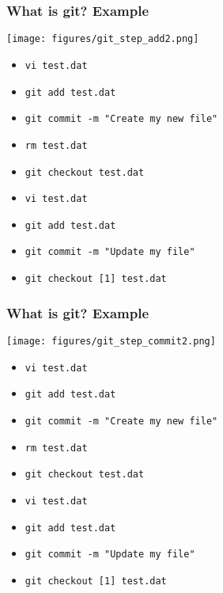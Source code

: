 \documentclass[xcolor=dvipsnames,10pt]{beamer}
\begin{document}
\addtocounter{framenumber}{-1}
\begin{frame}
 \frametitle{What is git? Example}
 
 \begin{center}
  \texttt{[image: figures/git\_step\_add2.png]}
 \end{center}
 \vspace*{-0.5cm}
 
 \begin{itemize}
  \color{gray}
  \item[] \texttt{vi test.dat}
  \item[] \texttt{git add test.dat}
  \item[] \texttt{git commit -m "Create my new file"}
  \item[] \texttt{rm test.dat}
  \item[] \texttt{git checkout test.dat}
  \item[] \texttt{vi test.dat}
  \color{black}
  \item   \texttt{git add test.dat}
  \color{white}
  \item[] \texttt{git commit -m "Update my file"}
  \item[] \texttt{git checkout [1] test.dat}
 \end{itemize}

\end{frame}
\addtocounter{framenumber}{-1}
\begin{frame}
 \frametitle{What is git? Example}
 
 \begin{center}
  \texttt{[image: figures/git\_step\_commit2.png]}
 \end{center}
 \vspace*{-0.5cm}
 
 \begin{itemize}
  \color{gray}
  \item[] \texttt{vi test.dat}
  \item[] \texttt{git add test.dat}
  \item[] \texttt{git commit -m "Create my new file"}
  \item[] \texttt{rm test.dat}
  \item[] \texttt{git checkout test.dat}
  \item[] \texttt{vi test.dat}
  \item[] \texttt{git add test.dat}
  \color{black}
  \item   \texttt{git commit -m "Update my file"}
  \color{white}
  \item[] \texttt{git checkout [1] test.dat}
 \end{itemize}

\end{frame}
\end{document}
